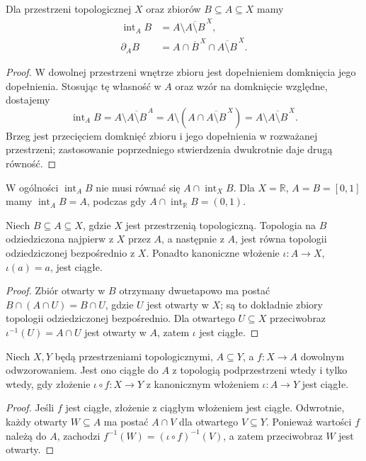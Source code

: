 \begin{stwierdzenie}
\label{prop:topog-podprzestrzen-wnetrze}
Dla przestrzeni topologicznej $X$ oraz zbiorów $B\subseteq A\subseteq X$
mamy
\begin{align*}
 \operatorname{int}_A B
 &=A\setminus\overline{A\setminus B}^{\,X},\\
 \partial_A B
 &=A\cap\overline B^{\,X}\cap\overline{A\setminus B}^{\,X}.
\end{align*}
\end{stwierdzenie}
\begin{proof}
W dowolnej przestrzeni wnętrze zbioru jest dopełnieniem
domknięcia jego dopełnienia. Stosując tę własność w $A$ oraz
wzór na domknięcie względne, dostajemy
\[
\operatorname{int}_A B
 =A\setminus\overline{A\setminus B}^{\,A}
 =A\setminus(A\cap\overline{A\setminus B}^{\,X})
 =A\setminus\overline{A\setminus B}^{\,X}.
\]
Brzeg jest przecięciem domknięć zbioru i jego dopełnienia
w rozważanej przestrzeni; zastosowanie poprzedniego
stwierdzenia dwukrotnie daje drugą równość.
\end{proof}

\begin{uwaga}
W ogólności $\operatorname{int}_A B$ nie musi równać się
$A\cap\operatorname{int}_X B$. Dla $X=\mathbb R$,
$A=B=[0,1]$ mamy $\operatorname{int}_A B=A$, podczas gdy
$A\cap\operatorname{int}_{\mathbb R}B=(0,1)$.
\end{uwaga}

\begin{stwierdzenie}
\label{prop:topog-podprzestrzen-przechodniosc}
Niech $B\subseteq A\subseteq X$, gdzie $X$ jest przestrzenią
topologiczną. Topologia na $B$ odziedziczona najpierw z $X$
przez $A$, a następnie z $A$, jest równa topologii
odziedziczonej bezpośrednio z $X$. Ponadto kanoniczne
włożenie $\iota\colon A\to X$, $\iota(a)=a$, jest ciągłe.
\end{stwierdzenie}
\begin{proof}
Zbiór otwarty w $B$ otrzymany dwuetapowo ma postać
$B\cap(A\cap U)=B\cap U$, gdzie $U$ jest otwarty w $X$;
są to dokładnie zbiory topologii odziedziczonej bezpośrednio.
Dla otwartego $U\subseteq X$ przeciwobraz
$\iota^{-1}(U)=A\cap U$ jest otwarty w $A$, zatem
$\iota$ jest ciągłe.
\end{proof}

\begin{twierdzenie}
\label{thm:topog-do-podprzestrzeni}
Niech $X,Y$ będą przestrzeniami topologicznymi,
$A\subseteq Y$, a $f\colon X\to A$ dowolnym odwzorowaniem.
Jest ono ciągłe do $A$ z topologią podprzestrzeni wtedy
i tylko wtedy, gdy złożenie $\iota\circ f\colon X\to Y$
z kanonicznym włożeniem $\iota\colon A\to Y$ jest ciągłe.
\end{twierdzenie}
\begin{proof}
Jeśli $f$ jest ciągłe, złożenie z ciągłym włożeniem
jest ciągłe. Odwrotnie, każdy otwarty $W\subseteq A$
ma postać $A\cap V$ dla otwartego $V\subseteq Y$.
Ponieważ wartości $f$ należą do $A$, zachodzi
$f^{-1}(W)=(\iota\circ f)^{-1}(V)$, a zatem
przeciwobraz $W$ jest otwarty.
\end{proof}

